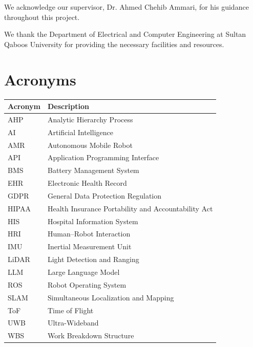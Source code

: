 \documentclass[11pt,a4paper]{article}
\begin{document}
We acknowledge our supervisor, Dr. Ahmed Chehib Ammari, for his guidance throughout this project.

We thank the Department of Electrical and Computer Engineering at Sultan Qaboos University for providing the necessary facilities and resources.

\newpage
\thispagestyle{empty}
\section*{Acronyms}

\begin{tabular}{@{}ll@{}}
\toprule
\textbf{Acronym} & \textbf{Description} \\
\midrule
AHP & Analytic Hierarchy Process \\
AI & Artificial Intelligence \\
AMR & Autonomous Mobile Robot \\
API & Application Programming Interface \\
BMS & Battery Management System \\
EHR & Electronic Health Record \\
GDPR & General Data Protection Regulation \\
HIPAA & Health Insurance Portability and Accountability Act \\
HIS & Hospital Information System \\
HRI & Human--Robot Interaction \\
IMU & Inertial Measurement Unit \\
LiDAR & Light Detection and Ranging \\
LLM & Large Language Model \\
ROS & Robot Operating System \\
SLAM & Simultaneous Localization and Mapping \\
ToF & Time of Flight \\
UWB & Ultra-Wideband \\
WBS & Work Breakdown Structure \\
\bottomrule
\end{tabular}

\newpage
\tableofcontents
\newpage
\end{document}
